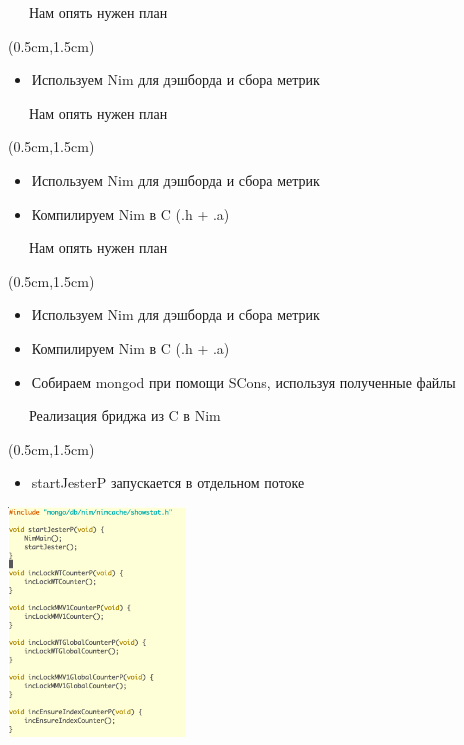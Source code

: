 \documentclass[xetex,18pt,aspectratio=43]{beamer}
\begin{document}
\begin{Large}
\begin{frame}{\ \ \ Нам опять нужен план}
\begin{textblock*}{\framewidth-0.8cm}(0.5cm,1.5cm)
\begin{itemize}
  \item Используем Nim для дэшборда и сбора метрик
\end{itemize}
\end{textblock*}
\end{frame}

\begin{frame}{\ \ \ Нам опять нужен план}
\begin{textblock*}{\framewidth-0.8cm}(0.5cm,1.5cm)
\begin{itemize}
  \item Используем Nim для дэшборда и сбора метрик
  \item Компилируем Nim в C (.h + .a)
\end{itemize}
\end{textblock*}
\end{frame}

\begin{frame}{\ \ \ Нам опять нужен план}
\begin{textblock*}{\framewidth-0.8cm}(0.5cm,1.5cm)
\begin{itemize}
  \item Используем Nim для дэшборда и сбора метрик
  \item Компилируем Nim в C (.h + .a)
  \item Собираем mongod при помощи SCons, используя полученные файлы
\end{itemize}
\end{textblock*}
\end{frame}

\begin{frame}{\ \ \ Реализация бриджа из C в Nim}
\begin{textblock*}{\framewidth-0.8cm}(0.5cm,1.5cm)
\begin{itemize}
  \item startJesterP запускается в отдельном потоке
\end{itemize}
\begin{minipage}{\textwidth}
  \centering
  \includegraphics[height=6.1cm]{img/c}
\end{minipage}
\end{textblock*}
\end{frame}


\end{Large}
\end{document}
